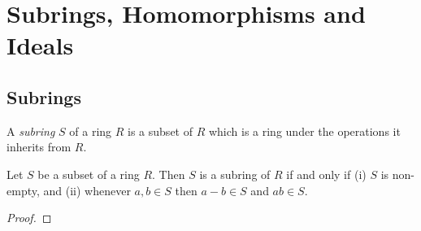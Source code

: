 \section{Subrings, Homomorphisms and Ideals}

\subsection{Subrings}

\begin{Def}
A \emph{subring} $S$ of a ring $R$ is a subset of $R$
which is a ring under the operations it inherits from $R$.
\end{Def}

\begin{Lemma}
Let $S$ be a subset of a ring $R$. Then $S$ is a subring
of $R$ if and only if (i) $S$ is non-empty, and (ii) whenever
$a, b \in S$ then $a - b \in S$ and $ab \in S$.
\end{Lemma}

\begin{proof}

\end{proof}

